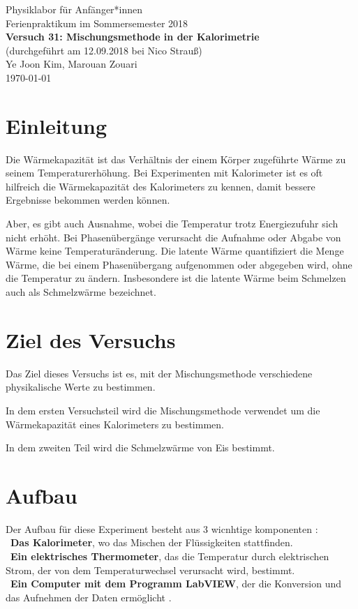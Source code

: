 \documentclass[11pt,a4paper]{article} %
\begin{document}
	

{
	\centering 
	\large 
	Physiklabor für Anfänger*innen \\
	Ferienpraktikum im Sommersemester 2018 \\[4mm]
	\textbf{\LARGE 
		Versuch 31: Mischungsmethode in der Kalorimetrie
	} \\[3mm]
	(durchgeführt am 12.09.2018 bei Nico Strauß) \\
	Ye Joon Kim, Marouan Zouari\\
	\today \\[10mm]
}

\tableofcontents
\newpage
\section{Einleitung}
Die Wärmekapazität ist das Verhältnis der einem Körper zugeführte Wärme zu seinem Temperaturerhöhung. Bei Experimenten mit Kalorimeter ist es oft hilfreich die Wärmekapazität des Kalorimeters zu kennen, damit bessere Ergebnisse bekommen werden können. 

Aber, es gibt auch Ausnahme, wobei die Temperatur trotz Energiezufuhr sich nicht erhöht. Bei Phasenübergänge verursacht die Aufnahme oder Abgabe von Wärme keine Temperaturänderung. Die latente Wärme quantifiziert die Menge Wärme, die bei einem Phasenübergang aufgenommen oder abgegeben wird, ohne die Temperatur zu ändern. Insbesondere ist die latente Wärme beim Schmelzen auch als Schmelzwärme bezeichnet. 


\section{Ziel des Versuchs}
Das Ziel dieses Versuchs ist es, mit der Mischungsmethode verschiedene physikalische Werte zu bestimmen. 

In dem ersten Versuchsteil wird die Mischungsmethode verwendet um die Wärmekapazität eines Kalorimeters zu bestimmen.

 In dem zweiten Teil wird die Schmelzwärme von Eis bestimmt. 

\section{Aufbau}
Der Aufbau f\"ur diese Experiment besteht aus 3 wicnhtige komponenten :
\\\
\textbf{Das Kalorimeter}, wo das Mischen der Flüssigkeiten stattfinden.
\\\
\textbf{Ein elektrisches Thermometer}, das die Temperatur durch elektrischen Strom, der von dem Temperaturwechsel verursacht wird, bestimmt.
\\\
\textbf{Ein Computer mit dem Programm LabVIEW}, der die Konversion und das Aufnehmen der Daten erm\"oglicht .
\end{document}
